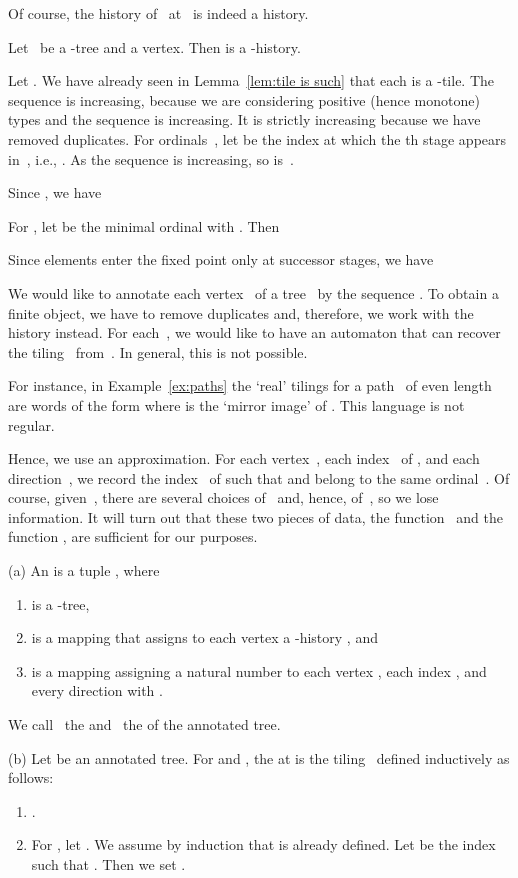 \documentclass{LMCS}
\begin{document}
Of course, the history of~ at~ is indeed a history.
\begin{lem}\label{lem:history is such}
Let ~be a -tree and  a vertex.
Then  is a -history.
\end{lem}

\proof
Let .
We have already seen in Lemma~\ref{lem:tile is such}
that each  is a -tile.
The sequence is increasing,
because we are considering positive (hence monotone) types
and the sequence  is increasing.
It is strictly increasing because we have removed duplicates.
For ordinals~, let  be the index
at which the th stage appears in~, i.e.,
.
As the sequence is increasing, so is~.

Since , we have

For , let  be the minimal ordinal with .
Then

Since elements enter the fixed point only at successor stages, we have


\noindent We would like to annotate each vertex~ of a tree~ by the sequence
. To obtain a finite object, we have to remove
duplicates and, therefore, we work with the history  instead.
For each~, we would like to have an automaton that can recover the
tiling~ from~.
In general, this is not possible.

For instance, in Example~\ref{ex:paths} the `real' tilings 
for a path~ of even length are words of the form 
where  is the `mirror image' of .
This language is not regular.

Hence, we use an approximation.
For each vertex~, each index~ of , and each direction~,
we record the index~ of  such that
 and  belong to the same ordinal~.
Of course, given~, there are several choices of~
and, hence, of~, so we lose information. It will turn out that
these two pieces of data,
the function~ and the function ,
are sufficient for our purposes.

\begin{defi}
\textup{(a)}
An  is a tuple , where
\begin{enumerate}
\item  is a -tree,
\item  is a mapping that assigns to each vertex  a -history , and
\item  is a mapping assigning a natural number 
  to each vertex , each index , and every direction 
  with .
\end{enumerate}
We call ~the  and ~the  of the annotated tree.

\textup{(b)}
Let  be an annotated tree.
For  and ,
the  at 
is the tiling~ defined inductively as follows\?:
\begin{enumerate}
\item .
\item For , let .
  We assume by induction that  is already defined.
  Let  be the index such that .
  Then we set .
\end{enumerate}
\end{defi}
\end{document}
